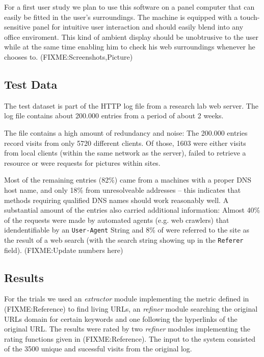 \documentclass[a4paper]{danarticle}
\theoremstyle{remark}
\begin{document}
      For a first user study we plan to use this software on a panel computer 
      that can easily be fitted in the user's surroundings. The machine is 
      equipped with a touch-sensitive panel for intuitive user interaction and 
      should easily blend into any office enviroment. This kind of ambient 
      display should be unobtrusive to the user while at the same time enabling 
      him to check his web surroundings whenever he chooses to.
      (FIXME:Screenshots,Picture)
    \subsection{Test Data}
      The test dataset is part of the HTTP log file from a research lab
      web server. The log file contains about 200.000 entries from a period of
      about 2 weeks.
      
      The file contains a high amount of redundancy and noise: The 200.000 
      entries record visits from only 5720 different clients. Of those, 1603 
      were either visits from local clients (within the same network as the 
      server), failed to retrieve a resource or were requests for pictures 
      within sites.
      
      Most of the remaining entries (82\%) came from a machines with a proper
      DNS host name, and only 18\% from unresolveable addresses -- this indicates
      that methods requiring qualified DNS names should work reasonably well. A
      substantial amount of the entries also carried additional information:
      Almost 40\% of the requests were made by automated agents (e.g. web
      crawlers) that idendentifiable by an \verb$User-Agent$ String and 8\% of
      were referred to the site as the result of a web search (with the search
      string showing up in the \verb$Referer$ field). (FIXME:Update numbers 
      here)
    \subsection{Results}
      For the trials we used an \textit{extractor} module implementing the
      metric defined in (FIXME:Reference) to find living URLs, an
      \textit{refiner} module searching the original URLs domain for certain
      keywords and one following the hyperlinks of the original URL. The results
      were rated by two \textit{refiner} modules implementing the rating
      functions given in (FIXME:Reference). The input to the system consisted of
      the 3500 unique and sucessful visits from the original log.
      
\end{document}
